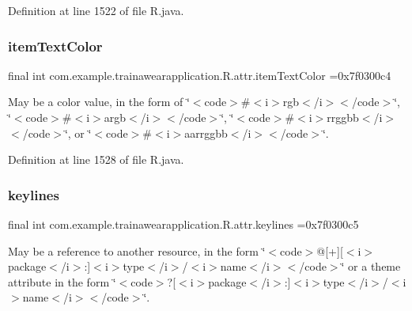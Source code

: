 Definition at line 1522 of file R.\+java.

\mbox{\label{classcom_1_1example_1_1trainawearapplication_1_1_r_1_1attr_ad6d1eeb7d218baf7075cb5ef6014e9f4}} 
\subsubsection{\texorpdfstring{itemTextColor}{itemTextColor}}
{\footnotesize\ttfamily final int com.\+example.\+trainawearapplication.\+R.\+attr.\+item\+Text\+Color =0x7f0300c4\hspace{0.3cm}{\ttfamily [static]}}

May be a color value, in the form of \char`\"{}$<$code$>$\#$<$i$>$rgb$<$/i$>$$<$/code$>$\char`\"{}, \char`\"{}$<$code$>$\#$<$i$>$argb$<$/i$>$$<$/code$>$\char`\"{}, \char`\"{}$<$code$>$\#$<$i$>$rrggbb$<$/i$>$$<$/code$>$\char`\"{}, or \char`\"{}$<$code$>$\#$<$i$>$aarrggbb$<$/i$>$$<$/code$>$\char`\"{}. 

Definition at line 1528 of file R.\+java.

\mbox{\label{classcom_1_1example_1_1trainawearapplication_1_1_r_1_1attr_afae5632614c6ea1d35d0f93841099ba3}} 
\subsubsection{\texorpdfstring{keylines}{keylines}}
{\footnotesize\ttfamily final int com.\+example.\+trainawearapplication.\+R.\+attr.\+keylines =0x7f0300c5\hspace{0.3cm}{\ttfamily [static]}}

May be a reference to another resource, in the form \char`\"{}$<$code$>$@\mbox{[}+\mbox{]}\mbox{[}$<$i$>$package$<$/i$>$\+:\mbox{]}$<$i$>$type$<$/i$>$/$<$i$>$name$<$/i$>$$<$/code$>$\char`\"{} or a theme attribute in the form \char`\"{}$<$code$>$?\mbox{[}$<$i$>$package$<$/i$>$\+:\mbox{]}$<$i$>$type$<$/i$>$/$<$i$>$name$<$/i$>$$<$/code$>$\char`\"{}. 

